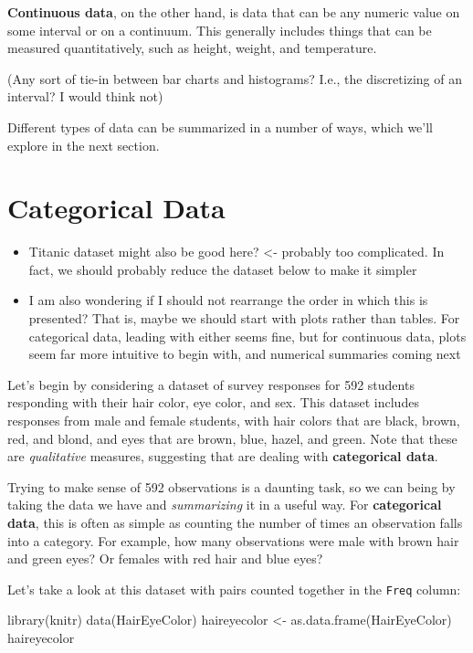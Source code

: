 \documentclass[
]{book}
\newenvironment{Shaded}{\begin{snugshade}}{\end{snugshade}}
\newcommand{\FunctionTok}[1]{\textcolor[rgb]{0.00,0.00,0.00}{#1}}
\newcommand{\NormalTok}[1]{#1}
\newcommand{\OtherTok}[1]{\textcolor[rgb]{0.56,0.35,0.01}{#1}}
\theoremstyle{definition}
\theoremstyle{definition}
\theoremstyle{definition}
\theoremstyle{remark}
\begin{document}
\textbf{Continuous data}, on the other hand, is data that can be any numeric value on some interval or on a continuum. This generally includes things that can be measured quantitatively, such as height, weight, and temperature.

(Any sort of tie-in between bar charts and histograms? I.e., the discretizing of an interval? I would think not)

Different types of data can be summarized in a number of ways, which we'll explore in the next section.

\hypertarget{categorical-data}{%
\section{Categorical Data}\label{categorical-data}}

\begin{itemize}
\item
  Titanic dataset might also be good here? \textless- probably too complicated. In fact, we should probably reduce the dataset below to make it simpler
\item
  I am also wondering if I should not rearrange the order in which this is presented? That is, maybe we should start with plots rather than tables. For categorical data, leading with either seems fine, but for continuous data, plots seem far more intuitive to begin with, and numerical summaries coming next
\end{itemize}

Let's begin by considering a dataset of survey responses for 592 students responding with their hair color, eye color, and sex. This dataset includes responses from male and female students, with hair colors that are black, brown, red, and blond, and eyes that are brown, blue, hazel, and green. Note that these are \emph{qualitative} measures, suggesting that are dealing with \textbf{categorical data}.

Trying to make sense of 592 observations is a daunting task, so we can being by taking the data we have and \emph{summarizing} it in a useful way. For \textbf{categorical data}, this is often as simple as counting the number of times an observation falls into a category. For example, how many observations were male with brown hair and green eyes? Or females with red hair and blue eyes?

Let's take a look at this dataset with pairs counted together in the \texttt{Freq} column:

\begin{Shaded}
\begin{Highlighting}[]
\FunctionTok{library}\NormalTok{(knitr)}
\FunctionTok{data}\NormalTok{(HairEyeColor)}
\NormalTok{haireyecolor }\OtherTok{\textless{}{-}} \FunctionTok{as.data.frame}\NormalTok{(HairEyeColor)}
\NormalTok{haireyecolor}
\end{Highlighting}
\end{Shaded}
\end{document}
